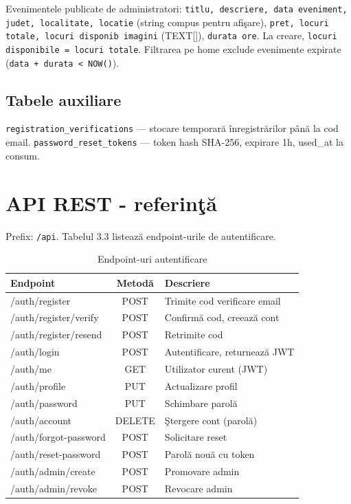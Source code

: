 Evenimentele publicate de administratori: \texttt{titlu, descriere, data \linebreak eveniment, judet, localitate, locatie} (string compus pentru afi\c sare), \texttt{pret, locuri \linebreak totale, locuri disponib imagini} (TEXT[]), \texttt{durata ore}. La creare, \texttt{locuri \linebreak disponibile = locuri totale}. Filtrarea pe home exclude evenimente expirate (\texttt{data + durata < NOW()}).

\subsection{Tabele auxiliare}

\texttt{registration\_verifications} --- stocare temporar\u a \^inregistr\u arilor p\^an\u a la cod email. 
\texttt{password\_reset\_tokens} --- token hash SHA-256, expirare 1h, used\_at la consum.

\section{API REST - referin\c t\u a}

Prefix: \texttt{/api}. Tabelul 3.3 listeaz\u a endpoint-urile de autentificare.

\begin{table}[htbp]
	\centering
	\begin{tabular}{|>{\ttfamily}p{5.5cm}|c|l|}
		\hline
		\textbf{Endpoint} & \textbf{Metod\u a} & \textbf{Descriere} \\ \hline
		/auth/register & POST & Trimite cod verificare email \\ \hline
		/auth/register/verify & POST & Confirm\u a cod, creeaz\u a cont \\ \hline
		/auth/register/resend & POST & Retrimite cod \\ \hline
		/auth/login & POST & Autentificare, returneaz\u a JWT \\ \hline
		/auth/me & GET & Utilizator curent (JWT) \\ \hline
		/auth/profile & PUT & Actualizare profil \\ \hline
		/auth/password & PUT & Schimbare parol\u a \\ \hline
		/auth/account & DELETE & \c Stergere cont (parol\u a) \\ \hline
		/auth/forgot-password & POST & Solicitare reset \\ \hline
		/auth/reset-password & POST & Parol\u a nou\u a cu token \\ \hline
		/auth/admin/create & POST & Promovare admin \\ \hline
		/auth/admin/revoke & POST & Revocare admin \\ \hline
	\end{tabular}
	\caption{Endpoint-uri autentificare}
	\label{tab:endpoints_auth}
\end{table}

